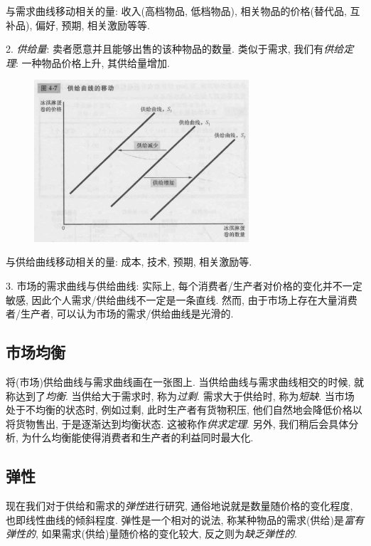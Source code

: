 与需求曲线移动相关的量: 收入(高档物品, 低档物品), 相关物品的价格(替代品, 互补品), 偏好, 预期, 相关激励等等. 

2. \textit{供给量}: 卖者愿意并且能够出售的该种物品的数量. 类似于需求, 我们有\textit{供给定理}: 一种物品价格上升, 其供给量增加. 

\begin{figure}[H]
	\centering
	\includegraphics[width=8cm]{attachment/Fig4_7.png}
\end{figure}

与供给曲线移动相关的量: 成本, 技术, 预期, 相关激励等. 

3. 市场的需求曲线与供给曲线: 实际上, 每个消费者/生产者对价格的变化并不一定敏感, 因此个人需求/供给曲线不一定是一条直线. 然而, 由于市场上存在大量消费者/生产者, 可以认为市场的需求/供给曲线是光滑的. 

\subsection{市场均衡}

将(市场)供给曲线与需求曲线画在一张图上. 当供给曲线与需求曲线相交的时候, 就称达到了\textit{均衡}. 当供给大于需求时, 称为\textit{过剩}. 需求大于供给时, 称为\textit{短缺}. 当市场处于不均衡的状态时, 例如过剩, 此时生产者有货物积压, 他们自然地会降低价格以将货物售出, 于是逐渐达到均衡状态. 这被称作\textit{供求定理}. 另外, 我们稍后会具体分析, 为什么均衡能使得消费者和生产者的利益同时最大化. 



\subsection{弹性}

现在我们对于供给和需求的\textit{弹性}进行研究, 通俗地说就是数量随价格的变化程度, 也即线性曲线的倾斜程度. 弹性是一个相对的说法, 称某种物品的需求(供给)是\textit{富有弹性的}, 如果需求(供给)量随价格的变化较大, 反之则为\textit{缺乏弹性的}. 

